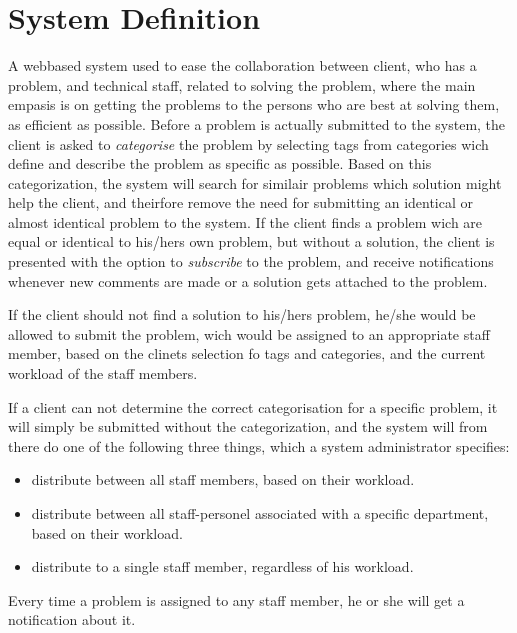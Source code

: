 \section{System Definition}
\label{sec:systemdefinition}


A webbased system used to ease the collaboration between client, who has a problem, and technical staff, related to solving the problem, where the main empasis is on getting the problems to the persons who are best at solving them, as efficient as possible.
Before a problem is actually submitted to the system, the client is asked to \textit{categorise} the problem by selecting tags from categories wich define and describe the problem as specific as possible. Based on this categorization, the system will search for similair problems which solution might help the client, and theirfore remove the need for submitting an identical or almost identical problem to the system. If the client finds a problem wich are equal or identical to his/hers own problem, but without a solution, the client is presented with the option to \textit{subscribe} to the problem, and receive notifications whenever new comments are made or a solution gets attached to the problem.

If the client should not find a solution to his/hers problem, he/she would be allowed to submit the problem, wich would be assigned to an appropriate staff member, based on the clinets selection fo tags and categories, and the current workload of the staff members.

If a client can not determine the correct categorisation for a specific problem, it will simply be submitted without the categorization, and the system will from there do one of the following three things, which a system administrator specifies:

\begin{itemize}
	\item distribute between all staff members, based on their workload.
	\item distribute between all staff-personel associated with a specific department, based on their workload.
	\item distribute to a single staff member, regardless of his workload.
\end{itemize}

Every time a problem is assigned to any staff member, he or she will get a notification about it.

